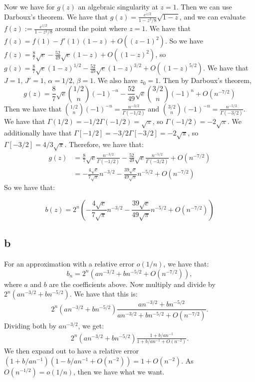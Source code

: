 \documentclass[]{article}
\theoremstyle{definition}
\numberwithin{theorem}{section}
\numberwithin{equation}{section}
\begin{document}
Now we have for $g(z)$ an algebraic singularity at $z = 1$. Then we can use Darboux's theorem. We have that $g(z) = \frac{e^{z/2}}{1 - z^3/8} \sqrt{1 - z}$, and we can evaluate $f(z) := \frac{e^{z/2}}{1 - z^3/8} $ around the point where $z = 1$. 
We have that $f(z) = f(1) - f'(1) (1 - z) + O((z - 1)^2)$. So we have $f(z) = \frac{8}{7}\sqrt{e} -  \frac{52}{49}\sqrt{e}(1-z) + O((1 - z)^2)$, so $g(z) = \frac{8}{7}\sqrt{e}(1 - z)^{1/2} -  \frac{52}{49}\sqrt{e}(1-z)^{3/2} + O((1 - z)^{5/2})$. 
We have that $J = 1$, $J' = 1$, $\alpha = 1/2$, $\beta = 1$. We also have $z_0 = 1$.
Then by Darboux's theorem, 
\begin{equation}
	[z^n] g(z) = \frac{8}{7}\sqrt{e} \binom{1/2}{n} (-1)^{-n} -  \frac{52}{49}\sqrt{e} \binom{3/2}{n}(-1)^n + O(n^{-7/2})
\end{equation}
Then we have that $\binom{1/2}{n} (-1)^{-n} = \frac{n^{-3/2}}{\Gamma(-1/2)}$ and  $\binom{3/2}{n} (-1)^{-n} = \frac{n^{-5/2}}{\Gamma(-3/2)}$. 
We have that $\Gamma(1/2) = -1/2 \Gamma(-1/2) = \sqrt{\pi}$, so $\Gamma(-1/2) = - 2 \sqrt{\pi}$. We additionally have that $\Gamma[-1/2] = -3/2 \Gamma[-3/2] = -2 \sqrt{\pi}$, so $\Gamma[-3/2] = 4/3 \sqrt{\pi}$. Therefore, we have that:
\begin{align*}
	[z^n] g(z) &= \frac{8}{7}\sqrt{e} \frac{n^{-3/2}}{\Gamma(-1/2)} -  \frac{52}{49}\sqrt{e} \frac{n^{-5/2}}{\Gamma(-3/2)} + O(n^{-7/2})\\
	&= -\frac{4 \sqrt{e}}{7 \sqrt{\pi}} n^{-3/2} - \frac{39 \sqrt{e}}{49\sqrt{\pi}} n^{-5/2} + O(n^{-7/2})
\end{align*}
So we have that:

\begin{equation}
	[z^n] b(z) = 2^n \left( -\frac{4 \sqrt{e}}{7 \sqrt{\pi}} n^{-3/2} - \frac{39 \sqrt{e}}{49\sqrt{\pi}} n^{-5/2} + O(n^{-7/2})\right)
\end{equation}
\subsection{b}
For an approximation with a relative error $o(1/n)$, we have that:
\begin{equation}
	b_n = 2^n ( a n^{-3/2} + b n^{-5/2} + O(n^{-7/2})),
\end{equation}
where $a$ and $b$ are the coefficients above. 
Now multiply and divide by $2^n(a n^{-3/2} + b n^{-5/2})$. We have that this is:
\begin{equation}
	2^n(a n^{-3/2} + b n^{-5/2}) \frac{a n^{-3/2} + b n^{-5/2}}{a n^{-3/2} + b n^{-5/2} + O(n^{-7/2})}.
\end{equation}
Dividing both by $a n^{-3/2}$, we get:
\begin{align*}
	2^n(a n^{-3/2} + b n^{-5/2}) \frac{1 + b/a n^{-1}}{1 + b/a n^{-1} + O(n^{-2})}.
\end{align*}
We then expand out to have a relative error $(1 + b/a n^{-1}) (1 -b/a n^{-1} + O(n^{-2})) = 1 + O(n^{-2})$. As $O(n^{-1/2})  = o(1/n)$, then we have what we want. 
\end{document}
